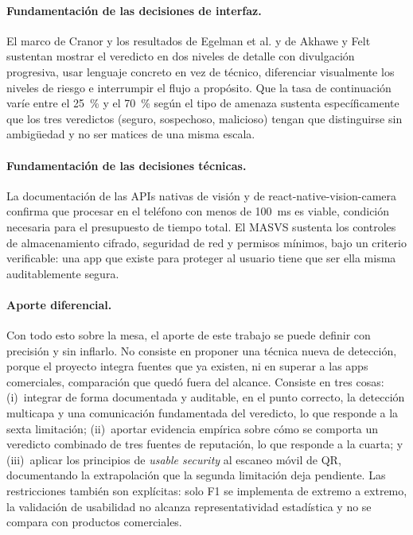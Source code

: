 \paragraph{Fundamentación de las decisiones de interfaz.}
El marco de Cranor \cite{cranor2008framework} y los resultados de Egelman et al.
\cite{egelman2008warned} y de Akhawe y Felt \cite{akhawe2013alice} sustentan mostrar el
veredicto en dos niveles de detalle con divulgación progresiva, usar lenguaje concreto en
vez de técnico, diferenciar visualmente los niveles de riesgo e interrumpir el flujo a
propósito. Que la tasa de continuación varíe entre el 25~\% y el 70~\% según el tipo de
amenaza \cite{akhawe2013alice} sustenta específicamente que los tres veredictos (seguro,
sospechoso, malicioso) tengan que distinguirse sin ambigüedad y no ser matices de una
misma escala.

\paragraph{Fundamentación de las decisiones técnicas.}
La documentación de las APIs nativas de visión
\cite{apple_vndetectbarcodes,google_mlkit_barcode} y de react-native-vision-camera
\cite{rousavy_visioncamera} confirma que procesar en el teléfono con menos de 100~ms es
viable, condición necesaria para el presupuesto de tiempo total. El MASVS
\cite{owasp2024masvs} sustenta los controles de almacenamiento cifrado, seguridad de red
y permisos mínimos, bajo un criterio verificable: una app que existe para proteger al
usuario tiene que ser ella misma auditablemente segura.

\paragraph{Aporte diferencial.}
Con todo esto sobre la mesa, el aporte de este trabajo se puede definir con precisión
y sin inflarlo. No consiste en proponer una técnica nueva de detección, porque el
proyecto integra fuentes que ya existen, ni en superar a las apps comerciales,
comparación que quedó fuera del alcance. Consiste en tres cosas: (i)~integrar de forma
documentada y auditable, en el punto correcto, la detección multicapa y una comunicación
fundamentada del veredicto, lo que responde a la sexta limitación; (ii)~aportar evidencia
empírica sobre cómo se comporta un veredicto combinado de tres fuentes de reputación, lo
que responde a la cuarta; y (iii)~aplicar los principios de \emph{usable security} al
escaneo móvil de QR, documentando la extrapolación que la segunda limitación deja
pendiente. Las restricciones también son explícitas: solo F1 se implementa de extremo a
extremo, la validación de usabilidad no alcanza representatividad estadística y no se
compara con productos comerciales.

